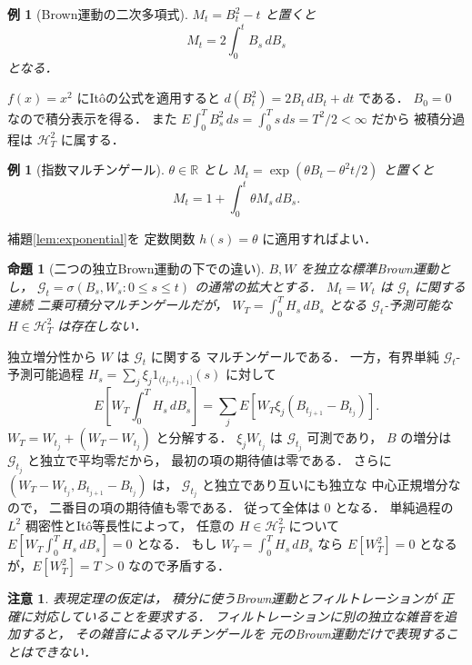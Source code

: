 \documentclass[a5paper,10pt,onecolumn]{jsarticle}
\makeatletter
\theoremstyle{mathnotetheorem}
\newtheorem{proposition}[theorem]{命題}
\newtheorem{example}[theorem]{例}
\newtheorem{remark}[theorem]{注意}
\renewcommand{\proofname}{証明}
\renewenvironment{proof}[1][\proofname]{%
  \par\pushQED{\qed}\normalfont\topsep4\p@\@plus2\p@\relax
  \trivlist\item[\hskip\labelsep\bfseries #1]\ignorespaces
}{\popQED\endtrivlist\@endpefalse}
\makeatother
\begin{document}
\begin{example}[Brown運動の二次多項式]
$M_t=B_t^2-t$ と置くと
\[
 M_t=2\int_0^tB_s\,dB_s
\]
となる．
\end{example}
\begin{proof}
$f(x)=x^2$ にIt\^oの公式を適用すると
$d(B_t^2)=2B_t\,dB_t+dt$ である．
$B_0=0$ なので積分表示を得る．
また
$E\int_0^TB_s^2\,ds=\int_0^Ts\,ds=T^2/2<\infty$ だから
被積分過程は $\mathcal H^2_T$ に属する．
\end{proof}

\begin{example}[指数マルチンゲール]
$\theta\in\mathbb R$ とし
$M_t=\exp(\theta B_t-\theta^2t/2)$ と置くと
\[
 M_t=1+\int_0^t\theta M_s\,dB_s.
\]
\end{example}
\begin{proof}
補題\ref{lem:exponential}を
定数関数 $h(s)=\theta$ に適用すればよい．
\end{proof}

\begin{proposition}[二つの独立Brown運動の下での違い]
$B,W$ を独立な標準Brown運動とし，
$\mathcal G_t=\sigma(B_s,W_s:0\le s\le t)$ の通常の拡大とする．
$M_t=W_t$ は $\mathcal G_t$ に関する連続
二乗可積分マルチンゲールだが，
$W_T=\int_0^TH_s\,dB_s$ となる
$\mathcal G_t$-予測可能な $H\in\mathcal H^2_T$
は存在しない．
\end{proposition}
\begin{proof}
独立増分性から $W$ は $\mathcal G_t$ に関する
マルチンゲールである．
一方，有界単純 $\mathcal G_t$-予測可能過程
$H_s=\sum_j\xi_j1_{(t_j,t_{j+1}]}(s)$ に対して
\[
 E\left[W_T\int_0^TH_s\,dB_s\right]
 =\sum_j E[W_T\xi_j(B_{t_{j+1}}-B_{t_j})].
\]
$W_T=W_{t_j}+(W_T-W_{t_j})$ と分解する．
$\xi_jW_{t_j}$ は $\mathcal G_{t_j}$ 可測であり，
$B$ の増分は $\mathcal G_{t_j}$ と独立で平均零だから，
最初の項の期待値は零である．
さらに $(W_T-W_{t_j}, B_{t_{j+1}}-B_{t_j})$ は，
$\mathcal G_{t_j}$ と独立であり互いにも独立な
中心正規増分なので，
二番目の項の期待値も零である．
従って全体は $0$ となる．
単純過程の $L^2$ 稠密性とIt\^o等長性によって，
任意の $H\in\mathcal H^2_T$ について
$E[W_T\int_0^TH_s\,dB_s]=0$ となる．
もし $W_T=\int_0^TH_s\,dB_s$ なら
$E[W_T^2]=0$ となるが，$E[W_T^2]=T>0$ なので矛盾する．
\end{proof}

\begin{remark}
表現定理の仮定は，
積分に使うBrown運動とフィルトレーションが
正確に対応していることを要求する．
フィルトレーションに別の独立な雑音を追加すると，
その雑音によるマルチンゲールを
元のBrown運動だけで表現することはできない．
\end{remark}
\end{document}
